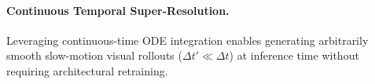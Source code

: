\documentclass[11pt]{article}
\begin{document}
\paragraph{Continuous Temporal Super-Resolution.} Leveraging continuous-time ODE integration enables generating arbitrarily smooth slow-motion visual rollouts ($\Delta t' \ll \Delta t$) at inference time without requiring architectural retraining.



\end{document}
